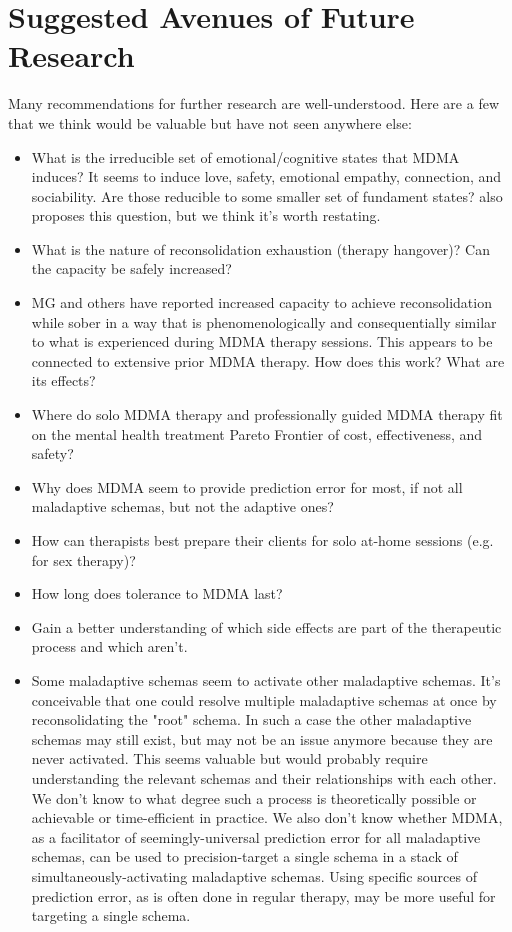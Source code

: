 \documentclass[12pt,letterpaper]{book}
\begin{document}
\chapter{Suggested Avenues of Future Research}
Many recommendations for further research are well-understood. Here are a few that we think would be valuable but have not seen anywhere else:
\begin{itemize}
    \item What is the irreducible set of emotional/cognitive states that MDMA induces? It seems to induce love, safety, emotional empathy, connection, and sociability. Are those reducible to some smaller set of fundament states? \textcite{regan2021Connection} also proposes this question, but we think it's worth restating.
    \item What is the nature of reconsolidation exhaustion (therapy hangover)? Can the capacity be safely increased?
    \item MG and others have reported increased capacity to achieve reconsolidation while sober in a way that is phenomenologically and consequentially similar to what is experienced during MDMA therapy sessions. This appears to be connected to extensive prior MDMA therapy. How does this work? What are its effects?
    \item Where do solo MDMA therapy and professionally guided MDMA therapy fit on the mental health treatment Pareto Frontier of cost, effectiveness, and safety?
    \item Why does MDMA seem to provide prediction error for most, if not all maladaptive schemas, but not the adaptive ones?
    \item How can therapists best prepare their clients for solo at-home sessions (e.g. for sex therapy)?
    \item How long does tolerance to MDMA last?
    \item Gain a better understanding of which side effects are part of the therapeutic process and which aren't.
    \item Some maladaptive schemas seem to activate other maladaptive schemas. It's conceivable that one could resolve multiple maladaptive schemas at once by reconsolidating the "root" schema. In such a case the other maladaptive schemas may still exist, but may not be an issue anymore because they are never activated. This seems valuable but would probably require understanding the relevant schemas and their relationships with each other. We don't know to what degree such a process is theoretically possible or achievable or time-efficient in practice. We also don't know whether MDMA, as a facilitator of seemingly-universal prediction error for all maladaptive schemas, can be used to precision-target a single schema in a stack of simultaneously-activating maladaptive schemas. Using specific sources of prediction error, as is often done in regular therapy, may be more useful for targeting a single schema.

\end{itemize}
\end{document}
